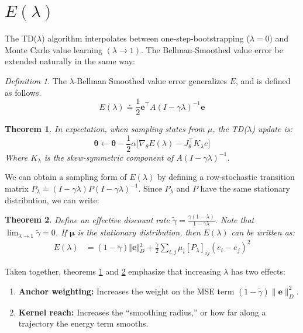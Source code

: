 \documentclass{article}
\theoremstyle{plain}
\newtheorem{theorem}{Theorem}[section]
\theoremstyle{definition}
\theoremstyle{remark}
\newtheorem{defn}{Definition}
\begin{document}
\section{$E(\lambda)$}
The TD($\lambda$) algorithm \cite{sutton_td} interpolates between one-step-bootstrapping ($\lambda=0$) and Monte Carlo value learning $(\lambda \rightarrow 1)$. The Bellman-Smoothed value error be extended naturally in the same way:
\begin{defn}
The $\lambda$-Bellman Smoothed value error generalizes $E$, and is defined as follows. 
\begin{equation}
    E(\lambda) \doteq \frac{1}{2}\bm{e}^\intercal A(I-\gamma \lambda)^{-1} \bm{e}    
\end{equation}
\end{defn}
\begin{theorem} \label{thm:td_lambda_E_lambda}
    In expectation, when sampling states from $\mu$, the TD($\lambda$) update is:
    \begin{equation}
        \bm{\theta} \leftarrow \bm{\theta} - \frac{1}{2}\alpha\big[  \nabla_\theta E(\lambda) - J_{\theta}^\intercal K_\lambda e \big] \label{eq:td_lambda_update_expected} 
    \end{equation}
    Where $K_\lambda$ is the skew-symmetric component of $A(I-\gamma \lambda)^{-1}$. 
\end{theorem}
We can obtain a sampling form of $E(\lambda)$ by defining a row-stochastic transition matrix $P_\lambda \doteq (I-\gamma \lambda) P (I-\gamma \lambda)^{-1}$. Since $P_\lambda$ and $P$ have the same stationary distribution, we can write:
\begin{theorem} \label{thm:sampling_form_E_lambda}
    Define an effective discount rate $\tilde{\gamma} = \frac{\gamma(1 - \lambda)}{1 - \gamma \lambda}$. Note that $\lim_{\lambda \rightarrow 1}\tilde{\gamma}=0$. If $\bm{\mu}$ is the stationary distribution, then $E(\lambda)$ can be written as:
    \begin{align} 
    E(\lambda) &= (1 - \tilde{\gamma}) \Vert{}\bm{e}\Vert{}_D^2 + \frac{\tilde{\gamma}}{2} \sum_{i,j} \mu_i [P_\lambda]_{ij} (e_i - e_j)^2 \end{align}
\end{theorem}

Taken together, theorems \ref{thm:td_lambda_E_lambda} and \ref{thm:sampling_form_E_lambda} emphasize that increasing $\lambda$ has two effects:
\begin{enumerate}
    \item \textbf{Anchor weighting:} Increases the weight on the MSE term $(1-\tilde{\gamma})\|\bm{e}\|_D^2$.
    \item \textbf{Kernel reach:} Increases the ``smoothing radius,'' or how far along a trajectory the energy term smooths.
\end{enumerate}
\end{document}
